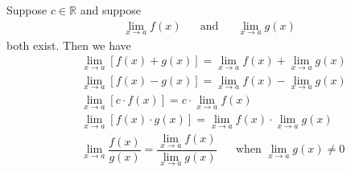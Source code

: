 \begin{theorem}
Suppose $c \in \mathbb{R}$ and suppose 
\begin{align*}
    \lim_{x \longrightarrow a} f(x) \hspace{20pt} \text{and} \hspace{20pt} \lim_{x \longrightarrow a} g(x)
\end{align*}
both exist. Then we have
\begin{align*}
    &\lim_{x \longrightarrow a} [f(x) + g(x)] = \lim_{x \longrightarrow a} f(x) + \lim_{x \longrightarrow a} g(x)\\[2ex]
    &\lim_{x \longrightarrow a} [f(x) - g(x)] = \lim_{x \longrightarrow a} f(x) - \lim_{x \longrightarrow a} g(x)\\[2ex]
    &\lim_{x \longrightarrow a} [c \cdot f(x)] = c \cdot \lim_{x \longrightarrow a} f(x)\\[2ex]
    &\lim_{x \longrightarrow a} [f(x) \cdot g(x)] = \lim_{x \longrightarrow a} f(x) \cdot \lim_{x \longrightarrow a} g(x)\\[2ex]
    &\lim_{x \longrightarrow a} \dfrac{f(x)}{g(x)} = \dfrac{\lim_{x \longrightarrow a} f(x)}{\lim_{x \longrightarrow a} g(x)} \hspace{20pt} \text{when} \hspace{4pt} \lim_{x \longrightarrow a} g(x) \neq 0
\end{align*}
\label{properties_limit_functions}
\end{theorem}

